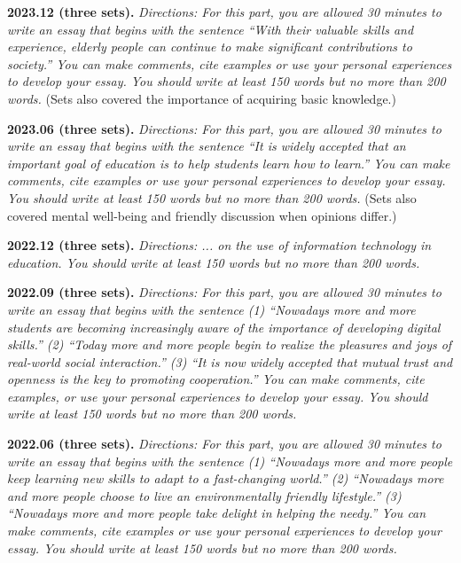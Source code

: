 \noindent\textbf{2023.12 (three sets).}\quad
\emph{Directions: For this part, you are allowed 30 minutes to write an essay that begins with the sentence ``With their valuable skills and experience, elderly people can continue to make significant contributions to society.'' You can make comments, cite examples or use your personal experiences to develop your essay. You should write at least 150 words but no more than 200 words.}
(Sets also covered the importance of acquiring basic knowledge.)
\par\medskip

\noindent\textbf{2023.06 (three sets).}\quad
\emph{Directions: For this part, you are allowed 30 minutes to write an essay that begins with the sentence ``It is widely accepted that an important goal of education is to help students learn how to learn.'' You can make comments, cite examples or use your personal experiences to develop your essay. You should write at least 150 words but no more than 200 words.}
(Sets also covered mental well-being and friendly discussion when opinions differ.)
\par\medskip

\noindent\textbf{2022.12 (three sets).}\quad
\emph{Directions: ... on the use of information technology in education. You should write at least 150 words but no more than 200 words.}
\par\medskip

\noindent\textbf{2022.09 (three sets).}\quad
\emph{Directions: For this part, you are allowed 30 minutes to write an essay that begins with the sentence
(1) ``Nowadays more and more students are becoming increasingly aware of the importance of developing digital skills.''
(2) ``Today more and more people begin to realize the pleasures and joys of real-world social interaction.''
(3) ``It is now widely accepted that mutual trust and openness is the key to promoting cooperation.''
You can make comments, cite examples, or use your personal experiences to develop your essay. You should write at least 150 words but no more than 200 words.}
\par\medskip

\noindent\textbf{2022.06 (three sets).}\quad
\emph{Directions: For this part, you are allowed 30 minutes to write an essay that begins with the sentence
(1) ``Nowadays more and more people keep learning new skills to adapt to a fast-changing world.''
(2) ``Nowadays more and more people choose to live an environmentally friendly lifestyle.''
(3) ``Nowadays more and more people take delight in helping the needy.''
You can make comments, cite examples or use your personal experiences to develop your essay. You should write at least 150 words but no more than 200 words.}
\par\medskip

